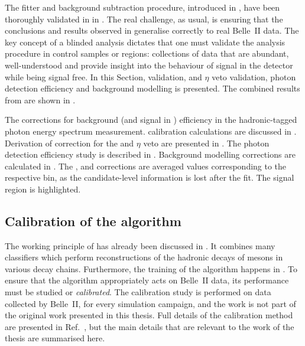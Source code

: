 The fitter and background subtraction procedure, introduced in ,
have been thoroughly validated in  in \MC.
The real challenge, as usual, is ensuring that the conclusions and results observed in \MC generalise correctly to real Belle~II data.
The key concept of a blinded analysis dictates that one must validate the analysis procedure in control samples or regions: collections of data that are abundant, well-understood and provide insight into the behaviour of signal in the detector while being signal free.
In this Section, \FEI validation, 
\piz and $\eta$ veto validation, photon detection efficiency and background modelling is presented.
The combined results from  are shown in .

\begin{table}[hbtp!]
    \centering
    \caption{\label{tab:correction_table} The corrections for background (and signal in ) efficiency in the hadronic-tagged \BtoXsgamma photon energy spectrum measurement.
    \FEI calibration calculations are discussed in .
    Derivation of correction for the \piz and $\eta$ veto are presented in .
    The photon detection efficiency study is described in .
    Background modelling corrections are calculated in .
    The \FEI, \piz and \g corrections are averaged values corresponding to the respective \EB bin,
    as the candidate-level information is lost after the \Mbc fit.
    The signal region is highlighted.
    }
    
\end{table}


\subsection{Calibration of the \texorpdfstring{\FEI}{FEI} algorithm}\label{sec:fei_calibration}

The working principle of \FEI has already been discussed in .
It combines many classifiers which perform reconstructions of the hadronic decays of \B mesons in various decay chains.
Furthermore, the training of the algorithm happens in \MC.
To ensure that the algorithm appropriately acts on Belle~II data, its performance must be studied or \textit{calibrated}.
The calibration study is performed on data collected by Belle~II, for every simulation campaign, and the work is not part of the original work presented in this thesis.
Full details of the calibration method are presented in Ref.~\cite{Belle-II:2020fst}, but the main details that are relevant to the work of the thesis are summarised here.

